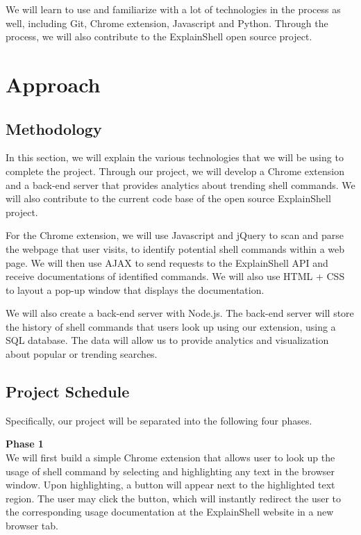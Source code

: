 \documentclass[11pt]{article}
\begin{document}
We will learn to use and familiarize with a lot of technologies in the process as well, including Git, Chrome extension, Javascript and Python. Through the process, we will also contribute to the ExplainShell open source project.

\section{Approach}
\subsection{Methodology}

In this section, we will explain the various technologies that we will be using to complete the project. Through our project, we will develop a Chrome extension and a back-end server that provides analytics about trending shell commands. We will also contribute to the current code base of the open source ExplainShell project. 

For the Chrome extension, we will use Javascript and jQuery to scan and parse the webpage that user visits, to identify potential shell commands within a web page. We will then use AJAX to send requests to the ExplainShell API and receive documentations of identified commands. We will also use HTML + CSS to layout a pop-up window that displays the documentation. 

We will also create a back-end server with Node.js. The back-end server will store the history of shell commands that users look up using our extension, using a SQL database. The data will allow us to provide analytics and visualization about popular or trending searches.

\subsection{Project Schedule}
Specifically, our project will be separated into the following four phases. 

\par{\bf Phase 1}\\ 
We will first build a simple Chrome extension that allows user to look up the usage of shell command by selecting and highlighting any text in the browser window. Upon highlighting, a button will appear next to the highlighted text region. The user may click the button, which will instantly redirect the user to the corresponding usage documentation at the ExplainShell website in a new browser tab.
\end{document}
